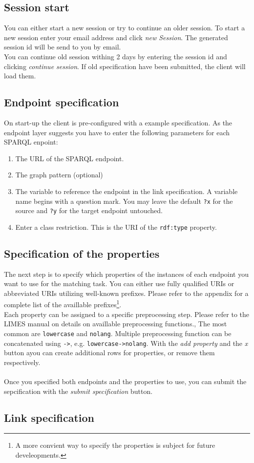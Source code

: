 \documentclass{article}
\begin{document}
\subsection{Session start}
You can either start a new session or try to continue an older session. To start a new session enter your email address and click \textit{new Session}. The generated session id will be send to you by email.\\ You can continue old session withing 2 days by entering the session id and clicking \textit{continue session}. If old specification have been submitted, the client will load them.
\subsection{Endpoint specification}
On start-up the client is pre-configured with a example specification. As the endpoint layer suggests you have to enter the following parameters for each SPARQL enpoint:

\begin{enumerate}
	\item The URL of the SPARQL endpoint.
	\item The graph pattern (optional)
	\item The variable to reference the endpoint in the link specification. A variable name begins with a question mark. You may leave the default \texttt{?x} for the source and \texttt{?y} for the target endpoint untouched.
	\item Enter a class restriction. This is the URI of the \texttt{rdf:type} property.
\end{enumerate}

\subsection{Specification of the properties}
The next step is to specify which properties of the instances of each endpoint you want to use for the matching task. You can either use fully qualified URIs or abbreviated URIs utilizing well-known prefixes. Please refer to the appendix for a complete list of the availlable prefixes\footnote{A more convient way to specify the properties is subject for future develeopments.}.\\Each property can be assigned to a specific preprocessing step. Please refer to the LIMES manual on details on availlable preprocessing functions., The most common are \texttt{lowercase} and \texttt{nolang}. Multiple preprocessing function can be concatenated using \texttt{->}, e.g. \texttt{lowercase->nolang}. With the \textit{add property} and the \textit{x} button ayou can create additional rows for properties, or remove them respectively.\\ \\
Once you specified both endpoints and the properties to use, you can submit the sepcification with the \textit{submit specification}  button.
\subsection{Link specification}
\end{document}
